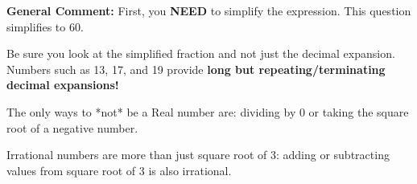 \documentclass{extbook}[14pt]
\begin{document}
\begin{enumerate}
{\textbf{General Comment:} First, you \textbf{NEED} to simplify the expression. This question simplifies to $60$. 
 
 Be sure you look at the simplified fraction and not just the decimal expansion. Numbers such as 13, 17, and 19 provide \textbf{long but repeating/terminating decimal expansions!} 
 
 The only ways to *not* be a Real number are: dividing by 0 or taking the square root of a negative number. 
 
 Irrational numbers are more than just square root of 3: adding or subtracting values from square root of 3 is also irrational.
}
\end{enumerate}
\end{document}
